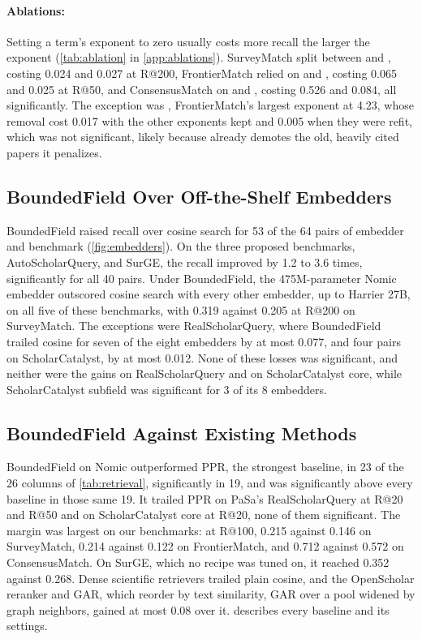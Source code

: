 \paragraph{Ablations:}
Setting a term's exponent to zero usually costs more recall the larger the exponent (\cref{tab:ablation} in \cref{app:ablations}). SurveyMatch split between  and , costing 0.024 and 0.027 at R@200, FrontierMatch relied on  and , costing 0.065 and 0.025 at R@50, and ConsensusMatch on  and , costing 0.526 and 0.084, all significantly. The exception was , FrontierMatch's largest exponent at 4.23, whose removal cost 0.017 with the other exponents kept and 0.005 when they were refit, which was not significant, likely because  already demotes the old, heavily cited papers it penalizes.

\subsection{BoundedField Over Off-the-Shelf Embedders}
\label{sec:embedders}

BoundedField raised recall over cosine search for 53 of the 64 pairs of embedder and benchmark (\cref{fig:embedders}). On the three proposed benchmarks, AutoScholarQuery, and SurGE, the recall improved by 1.2 to 3.6 times, significantly for all 40 pairs. Under BoundedField, the 475M-parameter Nomic embedder outscored cosine search with every other embedder, up to Harrier 27B, on all five of these benchmarks, with 0.319 against 0.205 at R@200 on SurveyMatch. The exceptions were RealScholarQuery, where BoundedField trailed cosine for seven of the eight embedders by at most 0.077, and four pairs on ScholarCatalyst, by at most 0.012. None of these losses was significant, and neither were the gains on RealScholarQuery and on ScholarCatalyst core, while ScholarCatalyst subfield was significant for 3 of its 8 embedders.

\subsection{BoundedField Against Existing Methods}
\label{sec:existing}

BoundedField on Nomic outperformed PPR, the strongest baseline, in 23 of the 26 columns of \cref{tab:retrieval}, significantly in 19, and was significantly above every baseline in those same 19. It trailed PPR on PaSa's RealScholarQuery at R@20 and R@50 and on ScholarCatalyst core at R@20, none of them significant. The margin was largest on our benchmarks: at R@100, 0.215 against 0.146 on SurveyMatch, 0.214 against 0.122 on FrontierMatch, and 0.712 against 0.572 on ConsensusMatch. On SurGE, which no recipe was tuned on, it reached 0.352 against 0.268. Dense scientific retrievers trailed plain cosine, and the OpenScholar reranker and GAR, which reorder by text similarity, GAR over a pool widened by graph neighbors, gained at most 0.08 over it.  describes every baseline and its settings.

